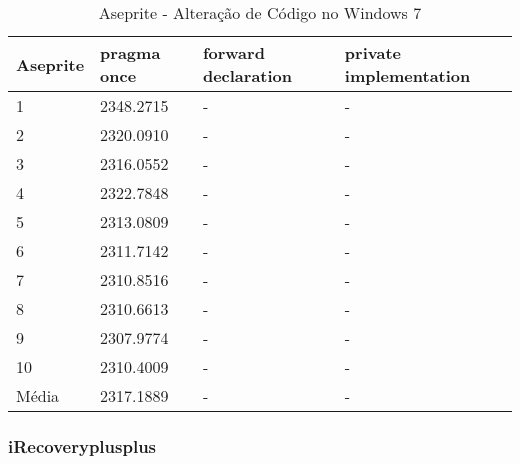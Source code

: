 \begin{table}[!h]
\centering
\caption{Aseprite - Alteração de Código no Windows 7}
\label{tab:alteracao_de_codigo:windows:aseprite}
\begin{tabular}{llll}
\textbf{Aseprite} & \textbf{pragma once} & \textbf{forward declaration} & \textbf{private implementation}   \\ \toprule
1                                    & 2348.2715  &  -   &  -   \\ 
2                                    & 2320.0910  &  -   &  -   \\ 
3                                    & 2316.0552  &  -   &  -   \\ 
4                                    & 2322.7848  &  -   &  -   \\ 
5                                    & 2313.0809  &  -   &  -   \\ 
6                                    & 2311.7142  &  -   &  -   \\ 
7                                    & 2310.8516  &  -   &  -   \\ 
8                                    & 2310.6613  &  -   &  -   \\ 
9                                    & 2307.9774  &  -   &  -   \\ 
10                                   & 2310.4009  &  -   &  -   \\ \bottomrule
Média                                & 2317.1889  &  -   &  -   \\ 
\end{tabular}
\end{table}

\clearpage
\subsubsection*{iRecoveryplusplus}

